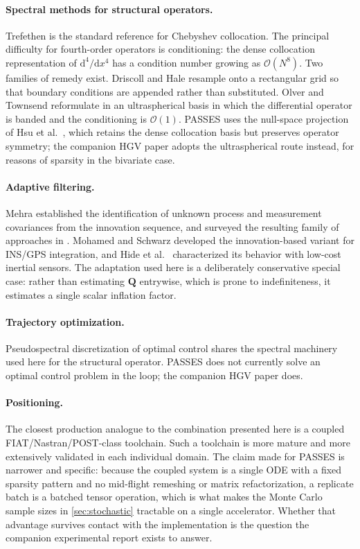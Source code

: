 \documentclass[11pt,a4paper]{article}
\theoremstyle{definition}
\numberwithin{equation}{section}
\newcommand{\diff}{\mathrm{d}}
\begin{document}
\paragraph{Spectral methods for structural operators.} Trefethen \cite{trefethen2000} is the standard reference for Chebyshev collocation. The principal difficulty for fourth-order operators is conditioning: the dense collocation representation of $\diff^4/\diff x^4$ has a condition number growing as $\mathcal{O}(N^8)$. Two families of remedy exist. Driscoll and Hale \cite{driscoll2016} resample onto a rectangular grid so that boundary conditions are appended rather than substituted. Olver and Townsend \cite{olver2013} reformulate in an ultraspherical basis in which the differential operator is banded and the conditioning is $\mathcal{O}(1)$. PASSES uses the null-space projection of Hsu et al.\ \cite{hsu2018}, which retains the dense collocation basis but preserves operator symmetry; the companion HGV paper adopts the ultraspherical route instead, for reasons of sparsity in the bivariate case.

\paragraph{Adaptive filtering.} Mehra \cite{mehra1970} established the identification of unknown process and measurement covariances from the innovation sequence, and surveyed the resulting family of approaches in \cite{mehra1972}. Mohamed and Schwarz \cite{mohamed1999} developed the innovation-based variant for INS/GPS integration, and Hide et al.\ \cite{hide2003} characterized its behavior with low-cost inertial sensors. The adaptation used here is a deliberately conservative special case: rather than estimating $\mathbf{Q}$ entrywise, which is prone to indefiniteness, it estimates a single scalar inflation factor.

\paragraph{Trajectory optimization.} Pseudospectral discretization of optimal control \cite{elnagar1995, benson2006, huntington2008} shares the spectral machinery used here for the structural operator. PASSES does not currently solve an optimal control problem in the loop; the companion HGV paper does.

\paragraph{Positioning.} The closest production analogue to the combination presented here is a coupled FIAT/Nastran/POST-class toolchain. Such a toolchain is more mature and more extensively validated in each individual domain. The claim made for PASSES is narrower and specific: because the coupled system is a single ODE with a fixed sparsity pattern and no mid-flight remeshing or matrix refactorization, a replicate batch is a batched tensor operation, which is what makes the Monte Carlo sample sizes in \cref{sec:stochastic} tractable on a single accelerator. Whether that advantage survives contact with the implementation is the question the companion experimental report exists to answer.
\end{document}
